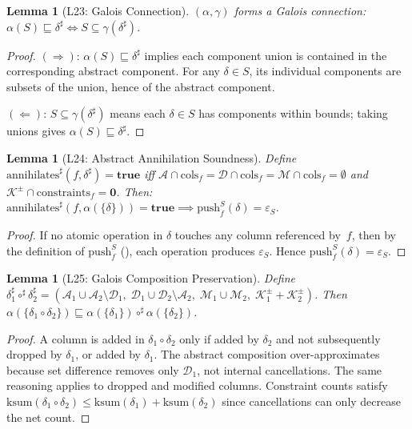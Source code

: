 \documentclass[11pt,a4paper]{article}
\newtheorem{lemma}[theorem]{Lemma}
\theoremstyle{definition}
\newcommand{\epsS}{\varepsilon_S}
\newcommand{\push}{\mathrm{push}}
\newcommand{\ann}{\mathrm{annihilates}}
\begin{document}
\begin{lemma}[L23: Galois Connection]\label{lem:galois-connection}
$(\alpha, \gamma)$ forms a Galois connection:
$\alpha(S) \sqsubseteq \delta^\sharp \iff S \subseteq \gamma(\delta^\sharp)$.
\end{lemma}

\begin{proof}
$(\Rightarrow)$: $\alpha(S) \sqsubseteq \delta^\sharp$ implies each component union
is contained in the corresponding abstract component.  For any $\delta \in S$,
its individual components are subsets of the union, hence of the abstract
component.

$(\Leftarrow)$: $S \subseteq \gamma(\delta^\sharp)$ means each $\delta \in S$
has components within bounds; taking unions gives $\alpha(S) \sqsubseteq \delta^\sharp$.
\end{proof}

\begin{lemma}[L24: Abstract Annihilation Soundness]\label{lem:abstract-ann}
Define $\ann^\sharp(f, \delta^\sharp) = \mathbf{true}$ iff
$\mathcal{A} \cap \mathrm{cols}_f = \mathcal{D} \cap \mathrm{cols}_f =
\mathcal{M} \cap \mathrm{cols}_f = \emptyset$ and
$\mathcal{K}^\pm \cap \mathrm{constraints}_f = \mathbf{0}$.
Then: $\ann^\sharp(f, \alpha(\{\delta\})) = \mathbf{true} \implies
\push_f^S(\delta) = \epsS$.
\end{lemma}

\begin{proof}
If no atomic operation in $\delta$ touches any column referenced by~$f$,
then by the definition of $\push_f^S$ (), each operation
produces $\epsS$.  Hence $\push_f^S(\delta) = \epsS$.
\end{proof}

\begin{lemma}[L25: Galois Composition Preservation]\label{lem:galois-compose}
Define $\delta_1^\sharp \circ^\sharp \delta_2^\sharp =
(\mathcal{A}_1 \cup \mathcal{A}_2 \setminus \mathcal{D}_1,\;
 \mathcal{D}_1 \cup \mathcal{D}_2 \setminus \mathcal{A}_2,\;
 \mathcal{M}_1 \cup \mathcal{M}_2,\;
 \mathcal{K}_1^\pm + \mathcal{K}_2^\pm)$.
Then $\alpha(\{\delta_1 \circ \delta_2\}) \sqsubseteq
\alpha(\{\delta_1\}) \circ^\sharp \alpha(\{\delta_2\})$.
\end{lemma}

\begin{proof}
A column is added in $\delta_1 \circ \delta_2$ only if added by $\delta_2$
and not subsequently dropped by $\delta_1$, or added by $\delta_1$.
The abstract composition over-approximates because set difference removes
only $\mathcal{D}_1$, not internal cancellations.  The same reasoning applies
to dropped and modified columns.  Constraint counts satisfy
$\mathrm{ksum}(\delta_1 \circ \delta_2) \le \mathrm{ksum}(\delta_1) +
\mathrm{ksum}(\delta_2)$ since cancellations can only decrease the net count.
\end{proof}
\end{document}
